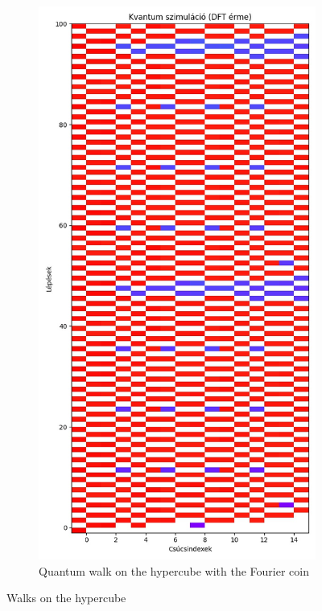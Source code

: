 \begin{figure}[H]
\begin{subfigure}{.45\linewidth}
  \end{subfigure}
  \begin{subfigure}{.45\linewidth}
    \centering
    \includegraphics[width=\linewidth]{./figures/results/hypercube/dft.jpg}
    \caption{Quantum walk on the hypercube with the Fourier coin}
  \end{subfigure}
  \caption{Walks on the hypercube}
\end{figure}
